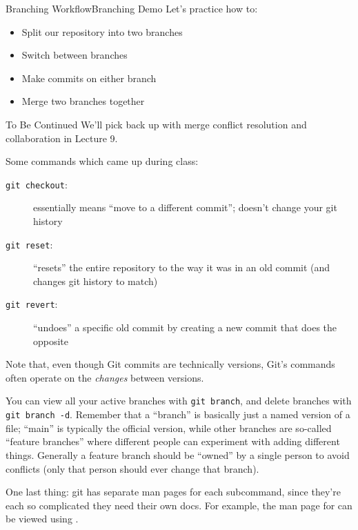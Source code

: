 \begin{frame}{Branching Workflow}{Branching Demo}
  Let's practice how to:
  \begin{itemize}
    \item Split our repository into two branches
    \item Switch between branches
    \item Make commits on either branch
    \item Merge two branches together
  \end{itemize}
\end{frame}

\begin{frame}{To Be Continued\textellipsis}
  We'll pick back up with merge conflict resolution and collaboration in Lecture 9.

  Some commands which came up during class:
  \begin{description}
    \item[\texttt{git checkout}:] essentially means \enquote{move to a
      different commit}; doesn't change your git history
    \item[\texttt{git reset}:] \enquote{resets} the entire repository to the
      way it was in an old commit (and changes git history to match)
    \item[\texttt{git revert}:] \enquote{undoes} a specific old commit by
      creating a new commit that does the opposite
  \end{description}

  Note that, even though Git commits are technically versions, Git's commands
  often operate on the \textit{changes} between versions.
\end{frame}

You can view all your active branches with \texttt{git branch}, and delete
branches with \texttt{git branch -d}.  Remember that a \enquote{branch} is
basically just a named version of a file; \enquote{main} is typically the
official version, while other branches are so-called \enquote{feature branches}
where different people can experiment with adding different things.  Generally
a feature branch should be \enquote{owned} by a single person to avoid
conflicts (only that person should ever change that branch).

One last thing: git has separate man pages for each subcommand, since they're
each so complicated they need their own docs.  For example, the man page for
 can be viewed using .


